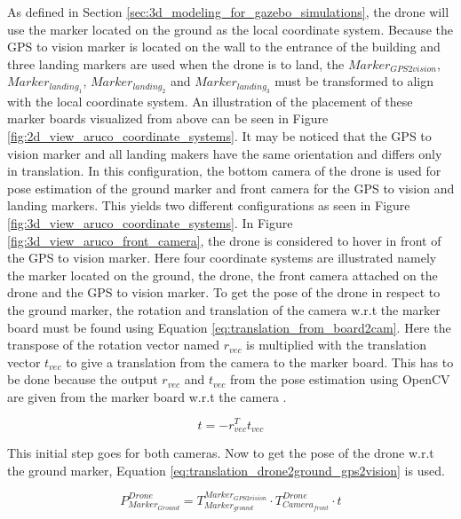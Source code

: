 \documentclass[../Head/report.tex]{subfiles}
\begin{document}
As defined in Section \ref{sec:3d_modeling_for_gazebo_simulations}, the drone will use the marker located on the ground as the local coordinate system. Because the GPS to vision marker is located on the wall to the entrance of the building and three landing markers are used when the drone is to land, the $Marker_{GPS2vision}$, $Marker_{landing_1}$, $Marker_{landing_2}$ and $Marker_{landing_3}$ must be transformed to align with the local coordinate system. An illustration of the placement of these marker boards visualized from above can be seen in Figure \ref{fig:2d_view_aruco_coordinate_systems}. It may be noticed that the GPS to vision marker and all landing makers have the same orientation and differs only in translation. In this configuration, the bottom camera of the drone is used for pose estimation of the ground marker and front camera for the GPS to vision and landing markers. This yields two different configurations as seen in Figure \ref{fig:3d_view_aruco_coordinate_systems}. In Figure \ref{fig:3d_view_aruco_front_camera}, the drone is considered to hover in front of the GPS to vision marker. Here four coordinate systems are illustrated namely the marker located on the ground, the drone, the front camera attached on the drone and the GPS to vision marker. To get the pose of the drone in respect to the ground marker, the rotation and translation of the camera w.r.t  the marker board must be found using Equation \ref{eq:translation_from_board2cam}. Here the transpose of the rotation vector named $r_{vec}$ is multiplied with the translation vector $t_{vec}$ to give a translation from the camera to the marker board. This has to be done because the output $r_{vec}$ and $t_{vec}$ from the pose estimation using OpenCV are given from the marker board w.r.t the camera \cite{theExtrinsicCameraMatrix}. 

\begin{equation}
	t = -r_{vec}^T t_{vec} 
	\label{eq:translation_from_board2cam}  
\end{equation} 

This initial step goes for both cameras. Now to get the pose of the drone w.r.t the ground marker, Equation \ref{eq:translation_drone2ground_gps2vision} is used.

\begin{equation}
	P^{Drone}_{Marker_{Ground}} = T^{Marker_{GPS2vision}}_{Marker_{ground}} \cdot T^{Drone}_{Camera_{front}} \cdot t
	\label{eq:translation_drone2ground_gps2vision} 
\end{equation}
\end{document}
